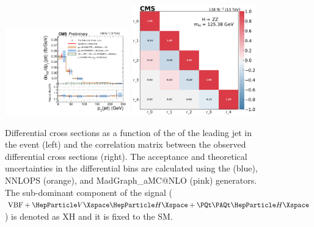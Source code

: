 \begin{center}
	\begin{figure}[!htb]
		\centering
		\includegraphics[width=0.48\textwidth]{Images/H4L/pTj1_unfoldwith_SM_125_asimov.pdf}
		\includegraphics[width=0.48\textwidth]{Images/H4L/correlations/corr_pTj1_v3.pdf}\\
		\caption{
			Differential cross sections as a function of the \pt of the leading jet in the event (left) and the correlation matrix between the observed differential cross sections (right).
			The acceptance and theoretical uncertainties in the differential bins are calculated using the \POWHEG (blue), NNLOPS (orange), and MadGraph\_aMC@NLO (pink) generators.
			The sub-dominant component of the signal ($\VBF + \VH + \ttH$) is denoted as XH and it is fixed to the SM.
			\label{fig:fidPTJ1}}
	\end{figure}
\end{center}

\clearpage


